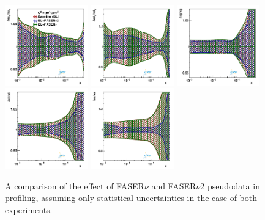 \begin{figure}[t]
\centering
\includegraphics[width=0.32\textwidth]{plots/proton_fasernu2/FASERv2_vs_FASERv/statOnly_FASERv_q2_10000_pdf_uv_ratio.pdf}
\includegraphics[width=0.32\textwidth]{plots/proton_fasernu2/FASERv2_vs_FASERv/statOnly_FASERv_q2_10000_pdf_dv_ratio.pdf}
\includegraphics[width=0.32\textwidth]{plots/proton_fasernu2/FASERv2_vs_FASERv/statOnly_FASERv_q2_10000_pdf_g_ratio.pdf}\\
\includegraphics[width=0.32\textwidth]{plots/proton_fasernu2/FASERv2_vs_FASERv/statOnly_FASERv_q2_10000_pdf_Sea_ratio.pdf}
\includegraphics[width=0.32\textwidth]{plots/proton_fasernu2/FASERv2_vs_FASERv/statOnly_FASERv_q2_10000_pdf_s_ratio.pdf}
\caption{
A comparison of the effect of FASER$\nu$ and FASER$\nu2$ pseudodata in profiling, 
assuming only statistical uncertainties in the case of both experiments.
}
\label{fig:profiling_FASERv2_vs_FASERv}
\end{figure}

